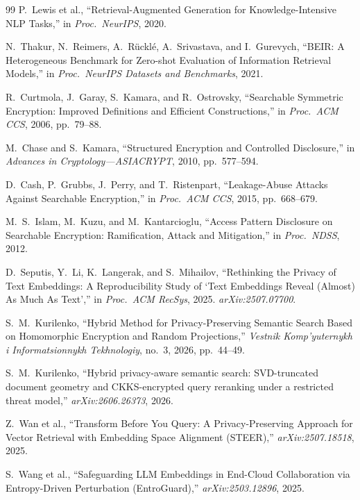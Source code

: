 \documentclass[11pt,a4paper]{article}
\begin{document}
\begin{thebibliography}{99}
 P.\ Lewis et al., ``Retrieval-Augmented Generation
for Knowledge-Intensive NLP Tasks,'' in \emph{Proc.\ NeurIPS}, 2020.

 N.\ Thakur, N.\ Reimers, A.\ R\"uckl\'e, A.\ Srivastava,
and I.\ Gurevych, ``BEIR: A Heterogeneous Benchmark for Zero-shot
Evaluation of Information Retrieval Models,'' in \emph{Proc.\ NeurIPS
Datasets and Benchmarks}, 2021.

 R.\ Curtmola, J.\ Garay, S.\ Kamara, and R.\ Ostrovsky,
``Searchable Symmetric Encryption: Improved Definitions and Efficient
Constructions,'' in \emph{Proc.\ ACM CCS}, 2006, pp.\ 79--88.

 M.\ Chase and S.\ Kamara, ``Structured Encryption
and Controlled Disclosure,'' in \emph{Advances in Cryptology---ASIACRYPT},
2010, pp.\ 577--594.

 D.\ Cash, P.\ Grubbs, J.\ Perry, and T.\
Ristenpart, ``Leakage-Abuse Attacks Against Searchable Encryption,'' in
\emph{Proc.\ ACM CCS}, 2015, pp.\ 668--679.

 M.\ S.\ Islam, M.\ Kuzu, and M.\ Kantarcioglu,
``Access Pattern Disclosure on Searchable Encryption: Ramification, Attack
and Mitigation,'' in \emph{Proc.\ NDSS}, 2012.

 D.\ Seputis, Y.\ Li, K.\ Langerak, and S.\
Mihailov, ``Rethinking the Privacy of Text Embeddings: A Reproducibility
Study of `Text Embeddings Reveal (Almost) As Much As Text','' in
\emph{Proc.\ ACM RecSys}, 2025. \emph{arXiv:2507.07700}.

 S.\ M.\ Kurilenko, ``Hybrid Method for
Privacy-Preserving Semantic Search Based on Homomorphic Encryption and
Random Projections,'' \emph{Vestnik Komp'yuternykh i Informatsionnykh
Tekhnologiy}, no.\ 3, 2026, pp.\ 44--49.

 S.\ M.\ Kurilenko, ``Hybrid privacy-aware semantic
search: SVD-truncated document geometry and CKKS-encrypted query reranking
under a restricted threat model,'' \emph{arXiv:2606.26373}, 2026.

\bibitem{ref_steer} Z.\ Wan et al., ``Transform Before You Query: A
Privacy-Preserving Approach for Vector Retrieval with Embedding Space
Alignment (STEER),'' \emph{arXiv:2507.18518}, 2025.

 S.\ Wang et al., ``Safeguarding LLM Embeddings in
End-Cloud Collaboration via Entropy-Driven Perturbation (EntroGuard),''
\emph{arXiv:2503.12896}, 2025.

\end{thebibliography}
\end{document}

